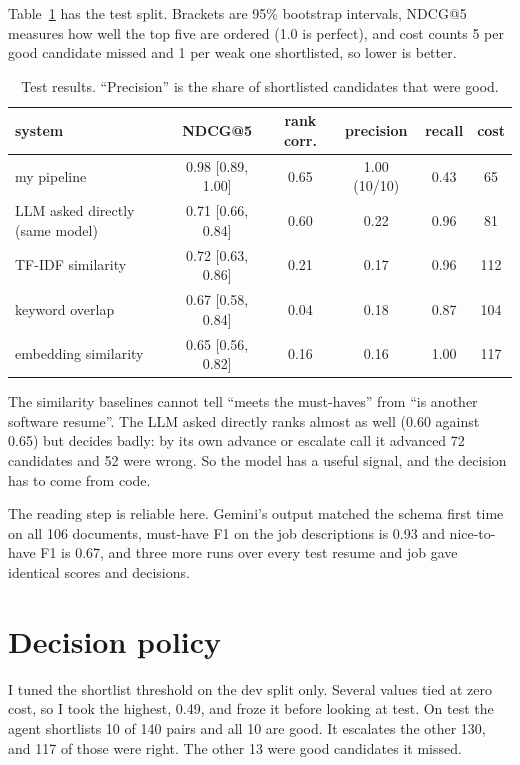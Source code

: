 \documentclass[conference]{styles/acmsiggraph}
\begin{document}
Table~\ref{tab:main} has the test split. Brackets are 95\% bootstrap intervals, NDCG@5 measures how well the top five are ordered (1.0 is perfect), and cost counts 5 per good candidate missed and 1 per weak one shortlisted, so lower is better.

\begin{table}[t]
\centering\small
\begin{tabular}{lccccc}
\toprule
system & NDCG@5 & rank corr. & precision & recall & cost \\
\midrule
my pipeline & 0.98 [0.89, 1.00] & 0.65 & 1.00 (10/10) & 0.43 & 65 \\
LLM asked directly (same model) & 0.71 [0.66, 0.84] & 0.60 & 0.22 & 0.96 & 81 \\
TF-IDF similarity & 0.72 [0.63, 0.86] & 0.21 & 0.17 & 0.96 & 112 \\
keyword overlap & 0.67 [0.58, 0.84] & 0.04 & 0.18 & 0.87 & 104 \\
embedding similarity & 0.65 [0.56, 0.82] & 0.16 & 0.16 & 1.00 & 117 \\
\bottomrule
\end{tabular}
\caption{Test results. ``Precision'' is the share of shortlisted candidates that were good.}
\label{tab:main}
\end{table}

The similarity baselines cannot tell ``meets the must-haves'' from ``is another software resume''. The LLM asked directly ranks almost as well (0.60 against 0.65) but decides badly: by its own advance or escalate call it advanced 72 candidates and 52 were wrong. So the model has a useful signal, and the decision has to come from code.

The reading step is reliable here. Gemini's output matched the schema first time on all 106 documents, must-have F1 on the job descriptions is 0.93 and nice-to-have F1 is 0.67, and three more runs over every test resume and job gave identical scores and decisions.

\section{Decision policy}

I tuned the shortlist threshold on the dev split only. Several values tied at zero cost, so I took the highest, 0.49, and froze it before looking at test. On test the agent shortlists 10 of 140 pairs and all 10 are good. It escalates the other 130, and 117 of those were right. The other 13 were good candidates it missed.
\end{document}
